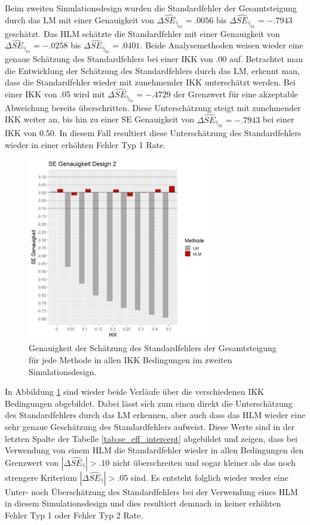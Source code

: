 \documentclass[12pt]{article}\usepackage[]{graphicx}\usepackage[]{color}
\begin{document}
Beim zweiten Simulationsdesign wurden die Standardfehler der Gesamtsteigung durch das LM mit einer Genauigkeit von $\Delta\widehat{SE}_{\widehat{\gamma}_{01}} = .0056$ bis $\Delta\widehat{SE}_{\widehat{\gamma}_{01}} = -.7943$ geschätzt. Das HLM schätzte die Standardfehler mit einer Genauigkeit von $\Delta\widehat{SE}_{\widehat{\gamma}_{01}} = -.0258$ bis $\Delta\widehat{SE}_{\widehat{\gamma}_{01}} = .0401$. Beide Analysemethoden weisen wieder eine genaue Schätzung des Standardfehlers bei einer IKK von .00 auf. Betrachtet man die Entwicklung der Schätzung des Standardfehlers durch das LM, erkennt man, dass die Standardfehler wieder mit zunehmender IKK unterschätzt werden. Bei einer IKK von .05 wird mit $\Delta\widehat{SE}_{\widehat{\gamma}_{01}} = -.4729$ der Grenzwert für eine akzeptable Abweichung bereits überschritten. Diese Unterschätzung steigt mit zunehmender IKK weiter an, bis hin zu einer SE Genauigkeit von $\Delta\widehat{SE}_{\widehat{\gamma}_{01}} = -.7943$ bei einer IKK von 0.50. In diesem Fall resultiert diese Unterschätzung des Standardfehlers wieder in einer erhöhten Fehler Typ 1 Rate.
\begin{figure}[t!]
\centering
\captionsetup{width=8cm}
\includegraphics[width=8cm, height=8cm]{se_genauigkeit_design2}
\caption{Genauigkeit der Schätzung des Standardfehlers der Gesamtsteigung für jede Methode in allen IKK Bedingungen im zweiten Simulationsdesign.}
\label{fig:se_genauigkeit_design2}
\end{figure}
In Abbildung \ref{fig:se_genauigkeit_design2} sind wieder beide Verläufe über die verschiedenen IKK Bedingungen abgebildet. Dabei lässt sich zum einen direkt die Unterschätzung des Standardfehlers durch das LM erkennen, aber auch dass das HLM wieder eine sehr genaue Geschätzung des Standardfehlers aufweist. Diese Werte sind in der letzten Spalte der Tabelle \ref{tab:se_eff_intercept} abgebildet und zeigen, dass bei Verwendung von einem HLM die Standardfehler wieder in allen Bedingungen den Grenzwert von $|\Delta\widehat{SE}_{\widehat{\gamma}}| > .10$ nicht überschreiten und sogar kleiner als das noch strengere Kriterium $|\Delta\widehat{SE}_{\widehat{\gamma}}| > .05$ sind. Es entsteht folglich wieder weder eine Unter- noch Überschätzung des Standardfehlers bei der Verwendung eines HLM in diesem Simulationsdesign und dies resultiert demnach in keiner erhöhten Fehler Typ 1 oder Fehler Typ 2 Rate.
\end{document}
